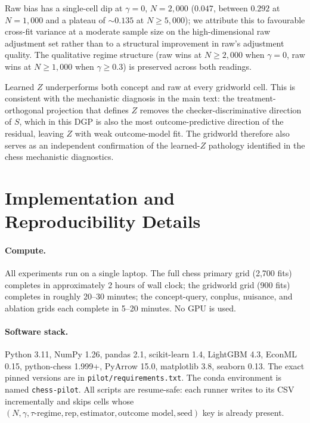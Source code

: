 \documentclass{article}
\begin{document}
Raw bias has a single-cell dip at $\gamma=0$, $N=2{,}000$ ($0.047$, between
$0.292$ at $N{=}1{,}000$ and a plateau of $\sim 0.135$ at $N\geq 5{,}000$);
we attribute this to favourable cross-fit variance at a moderate sample
size on the high-dimensional raw adjustment set rather than to a structural
improvement in raw's adjustment quality. The qualitative regime structure
(raw wins at $N\geq 2{,}000$ when $\gamma=0$, raw wins at $N\geq 1{,}000$
when $\gamma\geq 0.3$) is preserved across both readings.

Learned $Z$ underperforms both concept and raw at every gridworld cell. This
is consistent with the mechanistic diagnosis in the main text: the
treatment-orthogonal projection that defines $Z$ removes the
checker-discriminative direction of $S$, which in this DGP is also the
most outcome-predictive direction of the residual, leaving $Z$ with weak
outcome-model fit. The gridworld therefore also serves as an independent
confirmation of the learned-$Z$ pathology identified in the chess
mechanistic diagnostics.

\section{Implementation and Reproducibility Details}
\label{app:repro}

\paragraph{Compute.} All experiments run on a single laptop. The full chess
primary grid (2,700 fits) completes in approximately 2 hours of wall clock;
the gridworld grid (900 fits) completes in roughly 20--30 minutes; the
concept-query, conplus, nuisance, and ablation grids each complete in 5--20
minutes. No GPU is used.

\paragraph{Software stack.} Python 3.11, NumPy 1.26, pandas 2.1, scikit-learn
1.4, LightGBM 4.3, EconML 0.15, python-chess 1.999+, PyArrow 15.0,
matplotlib 3.8, seaborn 0.13. The exact pinned versions are in
\texttt{pilot/requirements.txt}. The conda environment is named
\texttt{chess-pilot}. All scripts are resume-safe: each runner writes to its
CSV incrementally and skips cells whose $(N, \gamma, \tau\text{-regime},
\text{rep}, \text{estimator}, \text{outcome model}, \text{seed})$ key is
already present.
\end{document}
